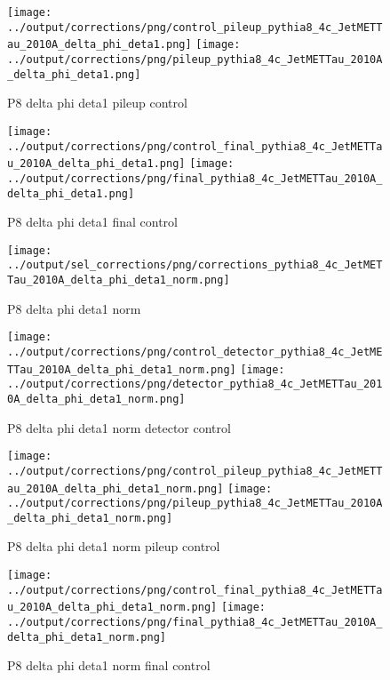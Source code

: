 \documentclass[11pt]{book}
\begin{document}
\begin{figure}[ht]
\centering
\texttt{[image: ../output/corrections/png/control\_pileup\_pythia8\_4c\_JetMETTau\_2010A\_delta\_phi\_deta1.png]}
\texttt{[image: ../output/corrections/png/pileup\_pythia8\_4c\_JetMETTau\_2010A\_delta\_phi\_deta1.png]}
\caption{P8 delta phi deta1 pileup control}
\label{fig:p8_JetMETTau_2010A_delta_phi_deta1_pileup_control}
\end{figure}


\begin{figure}[ht]
\centering
\texttt{[image: ../output/corrections/png/control\_final\_pythia8\_4c\_JetMETTau\_2010A\_delta\_phi\_deta1.png]}
\texttt{[image: ../output/corrections/png/final\_pythia8\_4c\_JetMETTau\_2010A\_delta\_phi\_deta1.png]}
\caption{P8 delta phi deta1 final control}
\label{fig:p8_JetMETTau_2010A_delta_phi_deta1_final_control}
\end{figure}


\begin{figure}[ht]
\centering
\texttt{[image: ../output/sel\_corrections/png/corrections\_pythia8\_4c\_JetMETTau\_2010A\_delta\_phi\_deta1\_norm.png]}
\caption{P8 delta phi deta1 norm}
\label{fig:p8_JetMETTau_2010A_delta_phi_deta1_norm}
\end{figure}

\begin{figure}[ht]
\centering
\texttt{[image: ../output/corrections/png/control\_detector\_pythia8\_4c\_JetMETTau\_2010A\_delta\_phi\_deta1\_norm.png]}
\texttt{[image: ../output/corrections/png/detector\_pythia8\_4c\_JetMETTau\_2010A\_delta\_phi\_deta1\_norm.png]}
\caption{P8 delta phi deta1 norm detector control}
\label{fig:p8_JetMETTau_2010A_delta_phi_deta1_norm_detector_control}
\end{figure}

\begin{figure}[ht]
\centering
\texttt{[image: ../output/corrections/png/control\_pileup\_pythia8\_4c\_JetMETTau\_2010A\_delta\_phi\_deta1\_norm.png]}
\texttt{[image: ../output/corrections/png/pileup\_pythia8\_4c\_JetMETTau\_2010A\_delta\_phi\_deta1\_norm.png]}
\caption{P8 delta phi deta1 norm pileup control}
\label{fig:p8_JetMETTau_2010A_delta_phi_deta1_norm_pileup_control}
\end{figure}


\begin{figure}[ht]
\centering
\texttt{[image: ../output/corrections/png/control\_final\_pythia8\_4c\_JetMETTau\_2010A\_delta\_phi\_deta1\_norm.png]}
\texttt{[image: ../output/corrections/png/final\_pythia8\_4c\_JetMETTau\_2010A\_delta\_phi\_deta1\_norm.png]}
\caption{P8 delta phi deta1 norm final control}
\label{fig:p8_JetMETTau_2010A_delta_phi_deta1_norm_final_control}
\end{figure}
\end{document}
